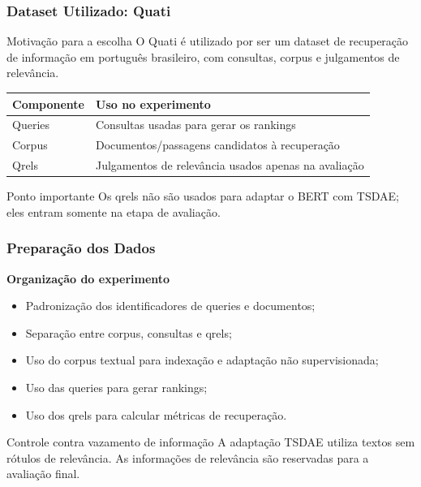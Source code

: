 \documentclass[aspectratio=169]{beamer}
\begin{document}
\begin{frame}
\frametitle{Dataset Utilizado: Quati}

\begin{block}{Motivação para a escolha}
O Quati é utilizado por ser um dataset de recuperação de informação em português brasileiro, com consultas, corpus e julgamentos de relevância.
\end{block}

\vspace{0.25cm}

\begin{table}
\centering
\small
\begin{tabular}{@{}ll@{}}
\toprule
\textbf{Componente} & \textbf{Uso no experimento} \\
\midrule
Queries & Consultas usadas para gerar os rankings \\
Corpus & Documentos/passagens candidatos à recuperação \\
Qrels & Julgamentos de relevância usados apenas na avaliação \\
\bottomrule
\end{tabular}
\end{table}

\vspace{0.25cm}

\begin{alertblock}{Ponto importante}
Os qrels não são usados para adaptar o BERT com TSDAE; eles entram somente na etapa de avaliação.
\end{alertblock}

\end{frame}

\begin{frame}
\frametitle{Preparação dos Dados}

\textbf{Organização do experimento}

\begin{itemize}
  \item Padronização dos identificadores de queries e documentos;
  \item Separação entre corpus, consultas e qrels;
  \item Uso do corpus textual para indexação e adaptação não supervisionada;
  \item Uso das queries para gerar rankings;
  \item Uso dos qrels para calcular métricas de recuperação.
\end{itemize}

\vspace{0.3cm}

\begin{block}{Controle contra vazamento de informação}
A adaptação TSDAE utiliza textos sem rótulos de relevância. As informações de relevância são reservadas para a avaliação final.
\end{block}

\end{frame}
\end{document}
